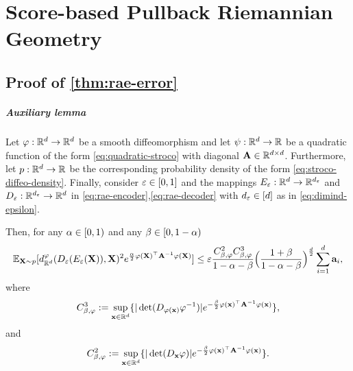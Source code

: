 \chapter{Score-based Pullback Riemannian Geometry}
\section{Proof of \ref{thm:rae-error}}
\label{app:proof-of-rae-error}

\paragraph{Auxiliary lemma}

\begin{lemma}
    \label{lem:rae-bound-phi-metric}
        Let $\varphi:\mathbb{R}^d \to \mathbb{R}^d$ be a smooth diffeomorphism and let $\psi: \mathbb{R}^d \to \mathbb{R}$ be a quadratic function of the form \ref{eq:quadratic-stroco} with diagonal $\mathbf{A} \in \mathbb{R}^{d\times d}$. Furthermore, let $p:\mathbb{R}^d \to\mathbb{R}$ be the corresponding probability density of the form \ref{eq:stroco-diffeo-density}. Finally, consider $\varepsilon\in [0,1]$ and the mappings $E_\varepsilon:\mathbb{R}^d \to \mathbb{R}^{d_\varepsilon}$ and $D_\varepsilon:\mathbb{R}^{d_\varepsilon} \to \mathbb{R}^d$ in \ref{eq:rae-encoder},\ref{eq:rae-decoder} with $d_\varepsilon \in [d]$ as in \ref{eq:dimind-epsilon}.
    
        Then, for any $\alpha \in [0,1)$ and any $\beta\in [0,1- \alpha)$
        \begin{equation}
        \mathbb{E}_{\mathbf{X} \sim p}[d_{\mathbb{R}^{d}}^\varphi (D_\varepsilon(E_\varepsilon(\mathbf{X})), \mathbf{X})^2 e^{\frac{\alpha}{2} \varphi(\mathbf{X})^\top \mathbf{A}^{-1} \varphi(\mathbf{X})}] \leq \varepsilon \frac{C^2_{\beta,\varphi} C^3_{\beta,\varphi}}{1 - \alpha - \beta} \Bigl(\frac{1 + \beta}{1 - \alpha - \beta} \Bigr)^{\frac{d}{2}} \sum_{i=1}^{d} \mathbf{a}_{i},
        \label{eq:lem-rae-bound}
\end{equation}
where
\begin{equation}
    C^3_{\beta,\varphi} := \sup_{\mathbf{x}\in \mathbb{R}^{d}} \{ |\det (D_{\varphi(\mathbf{x})} \varphi^{-1})| e^{-\frac{\beta}{2} \varphi(\mathbf{x})^\top \mathbf{A}^{-1} \varphi(\mathbf{x}) } \},
    \label{eq:RAEinvdiffeoRegConstant}
\end{equation}
and
\begin{equation}
    C^2_{\beta,\varphi} := \sup_{\mathbf{x}\in \mathbb{R}^{d}} \{ |\det (D_{\mathbf{x}} \varphi)| e^{-\frac{\beta}{2} \varphi(\mathbf{x})^\top \mathbf{A}^{-1} \varphi(\mathbf{x}) } \}.
    \label{eq:RAEdiffeoRegConstant}
\end{equation}
\end{lemma}

